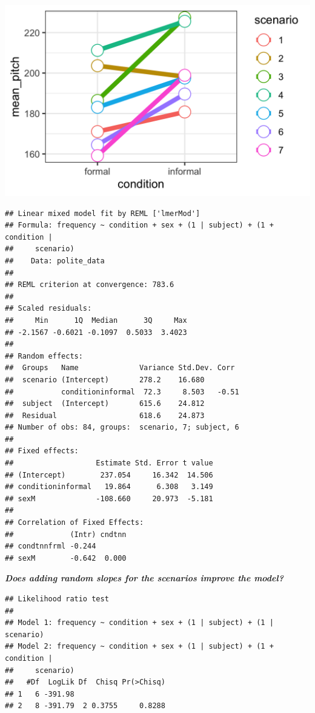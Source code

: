 \documentclass[
  openany]{book}
\begin{document}
\includegraphics[width=16.67in]{images/m3/scenario_slopes}

\begin{verbatim}
## Linear mixed model fit by REML ['lmerMod']
## Formula: frequency ~ condition + sex + (1 | subject) + (1 + condition |  
##     scenario)
##    Data: polite_data
## 
## REML criterion at convergence: 783.6
## 
## Scaled residuals: 
##     Min      1Q  Median      3Q     Max 
## -2.1567 -0.6021 -0.1097  0.5033  3.4023 
## 
## Random effects:
##  Groups   Name              Variance Std.Dev. Corr 
##  scenario (Intercept)       278.2    16.680        
##           conditioninformal  72.3     8.503   -0.51
##  subject  (Intercept)       615.6    24.812        
##  Residual                   618.6    24.873        
## Number of obs: 84, groups:  scenario, 7; subject, 6
## 
## Fixed effects:
##                   Estimate Std. Error t value
## (Intercept)        237.054     16.342  14.506
## conditioninformal   19.864      6.308   3.149
## sexM              -108.660     20.973  -5.181
## 
## Correlation of Fixed Effects:
##             (Intr) cndtnn
## condtnnfrml -0.244       
## sexM        -0.642  0.000
\end{verbatim}

\textbf{\emph{Does adding random slopes for the scenarios improve the model?}}

\begin{verbatim}
## Likelihood ratio test
## 
## Model 1: frequency ~ condition + sex + (1 | subject) + (1 | scenario)
## Model 2: frequency ~ condition + sex + (1 | subject) + (1 + condition | 
##     scenario)
##   #Df  LogLik Df  Chisq Pr(>Chisq)
## 1   6 -391.98                     
## 2   8 -391.79  2 0.3755     0.8288
\end{verbatim}
\end{document}
